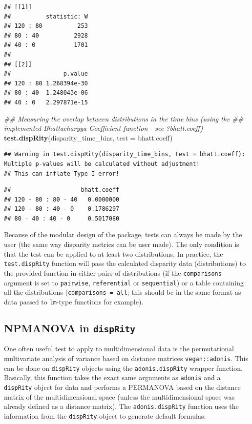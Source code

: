 \documentclass[]{book}
\newenvironment{Shaded}{\begin{snugshade}}{\end{snugshade}}
\newcommand{\CommentTok}[1]{\textcolor[rgb]{0.56,0.35,0.01}{\textit{#1}}}
\newcommand{\DataTypeTok}[1]{\textcolor[rgb]{0.13,0.29,0.53}{#1}}
\newcommand{\KeywordTok}[1]{\textcolor[rgb]{0.13,0.29,0.53}{\textbf{#1}}}
\newcommand{\NormalTok}[1]{#1}
\begin{document}
\begin{verbatim}
## [[1]]
##          statistic: W
## 120 : 80          253
## 80 : 40          2928
## 40 : 0           1701
## 
## [[2]]
##               p.value
## 120 : 80 1.268394e-30
## 80 : 40  1.248043e-06
## 40 : 0   2.297871e-15
\end{verbatim}

\begin{Shaded}
\begin{Highlighting}[]
\CommentTok{## Measuring the overlap between distributions in the time bins (using the}
\CommentTok{## implemented Bhattacharyya Coefficient function - see ?bhatt.coeff)}
\KeywordTok{test.dispRity}\NormalTok{(disparity_time_bins, }\DataTypeTok{test =}\NormalTok{ bhatt.coeff)}
\end{Highlighting}
\end{Shaded}

\begin{verbatim}
## Warning in test.dispRity(disparity_time_bins, test = bhatt.coeff): Multiple p-values will be calculated without adjustment!
## This can inflate Type I error!
\end{verbatim}

\begin{verbatim}
##                    bhatt.coeff
## 120 - 80 : 80 - 40   0.0000000
## 120 - 80 : 40 - 0    0.1786297
## 80 - 40 : 40 - 0     0.5017080
\end{verbatim}

Because of the modular design of the package, tests can always be made by the user (the same way disparity metrics can be user made).
The only condition is that the test can be applied to at least two distributions.
In practice, the \texttt{test.dispRity} function will pass the calculated disparity data (distributions) to the provided function in either pairs of distributions (if the \texttt{comparisons} argument is set to \texttt{pairwise}, \texttt{referential} or \texttt{sequential}) or a table containing all the distributions (\texttt{comparisons\ =\ all}; this should be in the same format as data passed to \texttt{lm}-type functions for example).

\hypertarget{npmanova-in-disprity}{%
\subsection{\texorpdfstring{NPMANOVA in \texttt{dispRity}}{NPMANOVA in dispRity}}\label{npmanova-in-disprity}}

One often useful test to apply to multidimensional data is the permutational multivariate analysis of variance based on distance matrices \texttt{vegan::adonis}.
This can be done on \texttt{dispRity} objects using the \texttt{adonis.dispRity} wrapper function.
Basically, this function takes the exact same arguments as \texttt{adonis} and a \texttt{dispRity} object for data and performs a PERMANOVA based on the distance matrix of the multidimensional space (unless the multidimensional space was already defined as a distance matrix).
The \texttt{adonis.dispRity} function uses the information from the \texttt{dispRity} object to generate default formulas:
\end{document}
